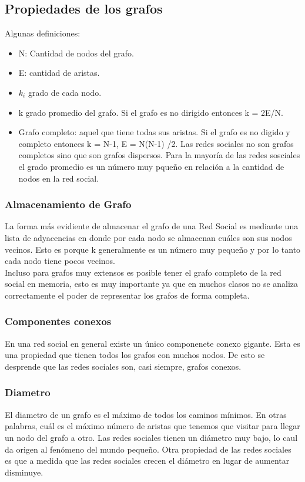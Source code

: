 \documentclass[titlepage,a4paper]{article}
\begin{document}
\subsection*{Propiedades de los grafos}
Algunas definiciones: 
\begin{itemize}
\item N: Cantidad de nodos del grafo. 
\item E: cantidad de aristas. 
\item $k_i$ grado de cada nodo. 
\item k grado promedio del grafo. Si el grafo es no dirigido entonces k = 2E/N.
\item Grafo completo: aquel que tiene todas sus aristas. Si el grafo es no digido y completo entonces k = N-1, E = N(N-1) /2. Las redes sociales no son grafos completos sino que son grafos dispersos. Para la mayoría de las redes sosciales el grado promedio es un número muy pqueño en relación a la cantidad de nodos en la red social. 
\end{itemize}

\subsubsection*{Almacenamiento de Grafo}

La forma más evidiente de almacenar el grafo de una Red Social es mediante una lista de adyacencias en donde por cada nodo se almacenan cuáles son sus nodos vecinos. Esto es porque k generalmente es un número muy pequeño y por lo tanto cada nodo tiene pocos vecinos. \\

Incluso para grafos muy extensos es posible tener el grafo completo de la red social en memoria, esto es muy importante ya que en muchos clasos no se analiza correctamente el poder de representar los grafos de forma completa. 


\subsubsection*{Componentes conexos}
En una red social en general existe un único componenete conexo gigante. Esta es una propiedad que tienen todos los grafos con muchos nodos. De esto se desprende que las redes sociales son, casi siempre, grafos conexos. 

\subsubsection*{Diametro}
El diametro de un grafo es el máximo de todos los caminos mínimos. En otras palabras, cuál es el máximo número de aristas que tenemos que visitar para llegar un nodo del grafo a otro. Las redes sociales tienen un diámetro muy bajo, lo caul da origen al fenómeno del mundo pequeño. Otra propiedad de las redes sociales es que a medida que las redes sociales crecen el diámetro en lugar de aumentar disminuye. 
\end{document}
